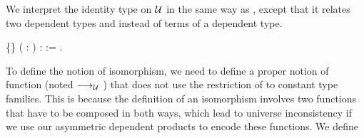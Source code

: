    We interpret the identity type on $\mathcal{U}$ in the same way as , except that it 
relates two dependent types  and  instead of terms of a dependent type.
\begin{coqdoccode}
\coqdocemptyline
\coqdocnoindent
{}  \{\} ( :  ) :   := \coqdocnotation{(} \coqdocvar{$\gamma$} \coqdocnotation{(} \coqdocnotation{$\star$} \coqdocvariable{$\gamma$}   \coqdocnotation{$\star$} \coqdocvariable{$\gamma$} \coqdocnotation{;} \coqdocvar{\_}\coqdocnotation{);}   \coqdocnotation{)}.\coqdoceol
\coqdocemptyline
\end{coqdoccode}
To define the notion of isomorphism, we need to define a proper
 notion of function (noted  $\longrightarrow_{\mathcal{U}}$ ) that does not use the
 restriction of  to constant type families. This is because the
 definition of an isomorphism involves two functions that have to be
 composed in both ways, which lead to universe inconsistency if we use
 our asymmetric dependent products to encode these functions. We define
